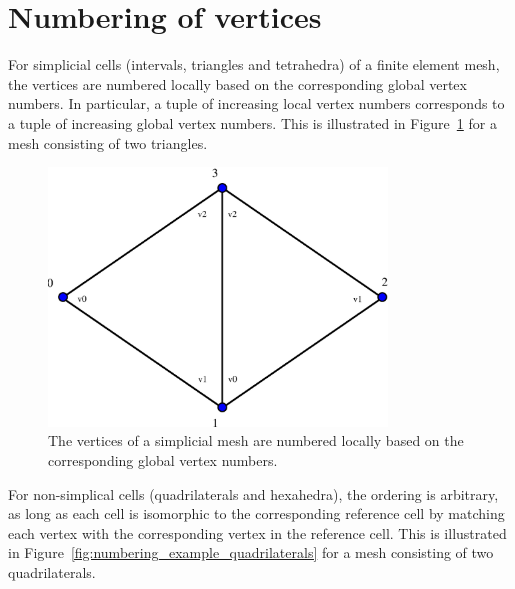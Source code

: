 \section{Numbering of vertices}

For simplicial cells (intervals, triangles and tetrahedra) of a finite
element mesh, the vertices are numbered locally based on the
corresponding global vertex numbers. In particular, a tuple of
increasing local vertex numbers corresponds to a tuple of increasing
global vertex numbers.  This is illustrated in
Figure~\ref{fig:numbering_example_triangles} for a mesh consisting of
two triangles.
 
\begin{figure}[htbp]
  \begin{center}
    \includegraphics[width=9cm]{eps/numbering_example_triangles.eps}
    \caption{The vertices of a simplicial mesh are numbered locally
      based on the corresponding global vertex numbers.}
    \label{fig:numbering_example_triangles}
  \end{center}
\end{figure}

For non-simplical cells (quadrilaterals and hexahedra), the ordering
is arbitrary, as long as each cell is isomorphic to the corresponding
reference cell by matching each vertex with the corresponding vertex
in the reference cell. This is illustrated in
Figure~\ref{fig:numbering_example_quadrilaterals} for a mesh
consisting of two quadrilaterals.

